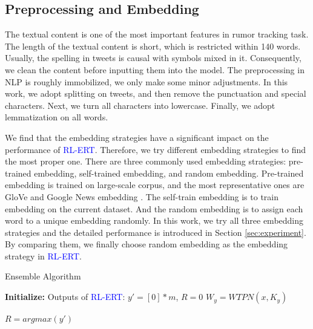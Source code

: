 \subsection{Preprocessing and Embedding}
\label{sec:process_embedding}
The textual content is one of the most important features in rumor tracking task. The length of the textual content is short, which is restricted within 140 words. Usually, the spelling in tweets is causal with symbols mixed in it. Consequently, we clean the content before inputting them into the model. The preprocessing in NLP is roughly immobilized, we only make some minor adjustments. In this work, we adopt splitting on tweets, and then remove the punctuation and special characters. Next, we turn all characters into lowercase. Finally, we adopt lemmatization on all words.

We find that the embedding strategies have a significant impact on the performance of \textcolor{blue}{RL-ERT}. Therefore, we try different embedding strategies to find the most proper one. There are three commonly used embedding strategies: pre-trained embedding, self-trained embedding, and random embedding. Pre-trained embedding is trained on large-scale corpus, and the most representative ones are GloVe \cite{DBLP:conf/emnlp/PenningtonSM14} and Google News embedding \cite{googlenews}. The self-train embedding is to train embedding on the current dataset. And the random embedding is to assign each word to a unique embedding randomly. In this work, we try all three embedding strategies and the detailed performance is introduced in Section \ref{sec:experiment}. By comparing them, we finally choose random embedding as the embedding strategy in \textcolor{blue}{RL-ERT}.

\begin{algorithm}[tbp]
	\caption{Ensemble Algorithm}
	\label{algorithm:RL-BRT}
	\LinesNumbered %
	\textbf{Initialize:} Outputs of \textcolor{blue}{RL-ERT}: $y' = [0]*m$, $R = 0$ \;
	$W_y =  WTPN(x, K_y)$ \;
	
	$R = argmax(y')$
\end{algorithm}

